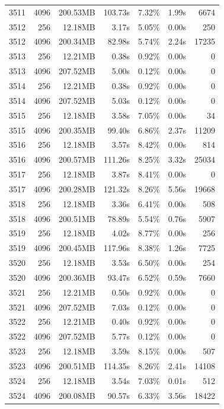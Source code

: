﻿\documentclass{sysuthesis}
\begin{document}
\begin{longtable}{crrrrrr}
	3511 & 4096 & 200.53MB & 103.73s & 7.32\% & 1.99s & 6674 \\
	3512 & 256 & 12.18MB & 3.17s & 5.05\% & 0.00s & 250 \\
	3512 & 4096 & 200.34MB & 82.98s & 5.74\% & 2.24s & 17235 \\
	3513 & 256 & 12.21MB & 0.38s & 0.92\% & 0.00s & 0 \\
	3513 & 4096 & 207.52MB & 5.00s & 0.12\% & 0.00s & 0 \\
	3514 & 256 & 12.21MB & 0.38s & 0.92\% & 0.00s & 0 \\
	3514 & 4096 & 207.52MB & 5.03s & 0.12\% & 0.00s & 0 \\
	3515 & 256 & 12.18MB & 3.58s & 7.05\% & 0.00s & 34 \\
	3515 & 4096 & 200.35MB & 99.40s & 6.86\% & 2.37s & 11209 \\
	3516 & 256 & 12.18MB & 3.57s & 8.42\% & 0.00s & 814 \\
	3516 & 4096 & 200.57MB & 111.26s & 8.25\% & 3.32s & 25034 \\
	3517 & 256 & 12.18MB & 3.87s & 8.41\% & 0.00s & 0 \\
	3517 & 4096 & 200.28MB & 121.32s & 8.26\% & 5.56s & 19668 \\
	3518 & 256 & 12.18MB & 3.36s & 6.41\% & 0.00s & 508 \\
	3518 & 4096 & 200.51MB & 78.89s & 5.54\% & 0.76s & 5907 \\
	3519 & 256 & 12.18MB & 4.02s & 8.77\% & 0.00s & 256 \\
	3519 & 4096 & 200.45MB & 117.96s & 8.38\% & 1.26s & 7725 \\
	3520 & 256 & 12.18MB & 3.53s & 6.50\% & 0.00s & 254 \\
	3520 & 4096 & 200.36MB & 93.47s & 6.52\% & 0.59s & 7660 \\
	3521 & 256 & 12.21MB & 0.50s & 0.92\% & 0.00s & 0 \\
	3521 & 4096 & 207.52MB & 7.03s & 0.12\% & 0.00s & 0 \\
	3522 & 256 & 12.21MB & 0.40s & 0.92\% & 0.00s & 0 \\
	3522 & 4096 & 207.52MB & 5.77s & 0.12\% & 0.00s & 0 \\
	3523 & 256 & 12.18MB & 3.59s & 8.15\% & 0.00s & 507 \\
	3523 & 4096 & 200.51MB & 114.35s & 8.26\% & 2.41s & 14108 \\
	3524 & 256 & 12.18MB & 3.54s & 7.03\% & 0.01s & 512 \\
	3524 & 4096 & 200.08MB & 90.57s & 6.33\% & 3.56s & 18422 \\
\end{longtable}
\end{document}
